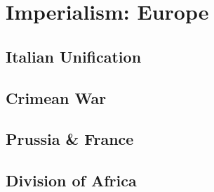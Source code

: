 \chapter{Imperialism: Europe}

\section{Italian Unification}

\section{Crimean War}

\section{Prussia \& France}

\section{Division of Africa}

